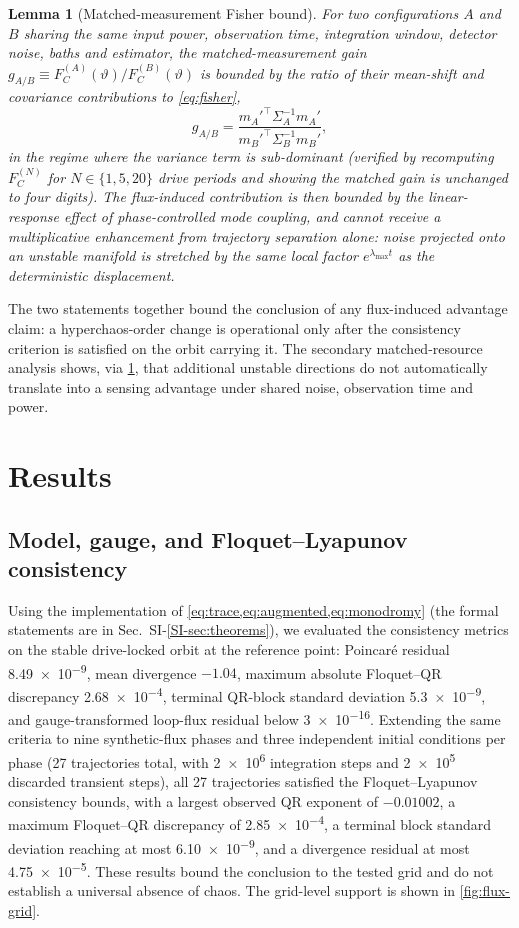 \documentclass[Phys]{SciPost}
\newtheorem{lemma}{Lemma}
\begin{document}
\begin{lemma}[Matched-measurement Fisher bound]
\label{lem:matched-fisher}
For two configurations $A$ and $B$ sharing the same input power, observation time, integration window, detector noise, baths and estimator, the matched-measurement gain $g_{A/B}\equiv F_C^{(A)}(\vartheta)/F_C^{(B)}(\vartheta)$ is bounded by the ratio of their mean-shift and covariance contributions to \cref{eq:fisher},
\begin{equation}
g_{A/B}=\frac{m_A'^{\!\top}\Sigma_A^{-1}m_A'}{m_B'^{\!\top}\Sigma_B^{-1}m_B'},
\end{equation}
in the regime where the variance term is sub-dominant (verified by recomputing $F_C^{(N)}$ for $N\in\{1,5,20\}$ drive periods and showing the matched gain is unchanged to four digits). The flux-induced contribution is then bounded by the linear-response effect of phase-controlled mode coupling, and cannot receive a multiplicative enhancement from trajectory separation alone: noise projected onto an unstable manifold is stretched by the same local factor $e^{\lambda_{\max}t}$ as the deterministic displacement.
\end{lemma}

The two statements together bound the conclusion of any flux-induced advantage claim: a hyperchaos-order change is operational only after the consistency criterion is satisfied on the orbit carrying it. The secondary matched-resource analysis shows, via \cref{lem:matched-fisher}, that additional unstable directions do not automatically translate into a sensing advantage under shared noise, observation time and power.

\section{Results}
\label{sec:results}

\subsection{Model, gauge, and Floquet--Lyapunov consistency}

Using the implementation of \cref{eq:trace,eq:augmented,eq:monodromy} (the formal statements are in Sec.~SI-\ref{SI-sec:theorems}), we evaluated the consistency metrics on the stable drive-locked orbit at the reference point: Poincar\'e residual \num{8.49e-9}, mean divergence $-\num{1.04}$, maximum absolute Floquet--QR discrepancy \num{2.68e-4}, terminal QR-block standard deviation \num{5.3e-9}, and gauge-transformed loop-flux residual below \num{3e-16}. Extending the same criteria to nine synthetic-flux phases and three independent initial conditions per phase (27 trajectories total, with \num{2e6} integration steps and \num{2e5} discarded transient steps), all 27 trajectories satisfied the Floquet--Lyapunov consistency bounds, with a largest observed QR exponent of $-\num{0.01002}$, a maximum Floquet--QR discrepancy of \num{2.85e-4}, a terminal block standard deviation reaching at most \num{6.10e-9}, and a divergence residual at most \num{4.75e-5}. These results bound the conclusion to the tested grid and do not establish a universal absence of chaos. The grid-level support is shown in \cref{fig:flux-grid}.
\end{document}
